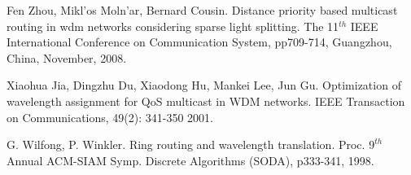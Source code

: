 \documentclass[conference]{IEEEtran}
\begin{document}
\begin{thebibliography}{1}
Fen Zhou, Mikl\a'os Moln\a'ar, Bernard Cousin. Distance priority based multicast routing in wdm networks considering sparse light splitting. The 11$^{th}$ IEEE International Conference on Communication System, pp709-714, Guangzhou, China, November, 2008.

Xiaohua Jia, Dingzhu Du, Xiaodong Hu, Mankei Lee, Jun Gu. Optimization of wavelength assignment for QoS multicast in WDM networks. IEEE Transaction on Communications, 49(2): 341-350 2001.

G. Wilfong, P. Winkler. Ring routing and wavelength translation. Proc. $9^{th}$ Annual ACM-SIAM Symp. Discrete Algorithms (SODA), p333-341, 1998.

\end{thebibliography}
\end{document}
